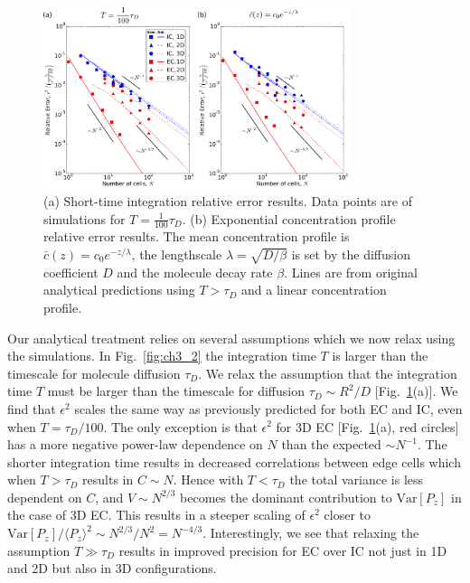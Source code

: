 \begin{figure}[ht]
    \centering
        \includegraphics[width=0.8\textwidth]{../fig/ch3_si1.png}
    \caption{(a) Short-time integration relative error results. Data points are of simulations for $T= \frac{1}{100} \tau_D$. (b) Exponential concentration profile relative error results. The mean concentration profile is $\bar{c}(z) = c_0 e^{-z/\lambda}$, the lengthscale $\lambda=\sqrt{D/\beta}$ is set by the diffusion coefficient $D$ and the molecule decay rate $\beta$. Lines are from original analytical predictions using $T > \tau_D$ and a linear concentration profile.} \label{fig:ch3_3}
\end{figure}

Our analytical treatment relies on several assumptions which we now relax using the simulations. In Fig.\ \ref{fig:ch3_2} the integration time $T$ is larger than the timescale for molecule diffusion $\tau_D$.
We relax the assumption that the integration time $T$ must be larger than the timescale for diffusion $\tau_D \sim R^2/D$ [Fig.\ \ref{fig:ch3_3}(a)]. We find that $\epsilon^2$ scales the same way as previously predicted for both EC and IC, even when $T = \tau_D/100$. The only exception is that $\epsilon^2$ for 3D EC [Fig.\ \ref{fig:ch3_3}(a), red circles] has a more negative power-law dependence on $N$ than the expected $\sim N^{-1}$. The shorter integration time results in decreased correlations between edge cells which when $T>\tau_D$ results in $C\sim N$. Hence with
$T < \tau_D$
the total variance is less dependent on $C$, and $V \sim N^{2/3}$ becomes the dominant contribution to $\text{Var}[P_z]$ in the case of 3D EC. This results in a steeper scaling of $\epsilon^2$ closer to
$\text{Var}[P_z]/\langle P_z \rangle^2 \sim N^{2/3}/N^2 = N^{-4/3}$.
Interestingly, we see that relaxing the assumption $T \gg \tau_D$ results in improved precision for EC over IC not just in 1D and 2D but also in 3D configurations.


